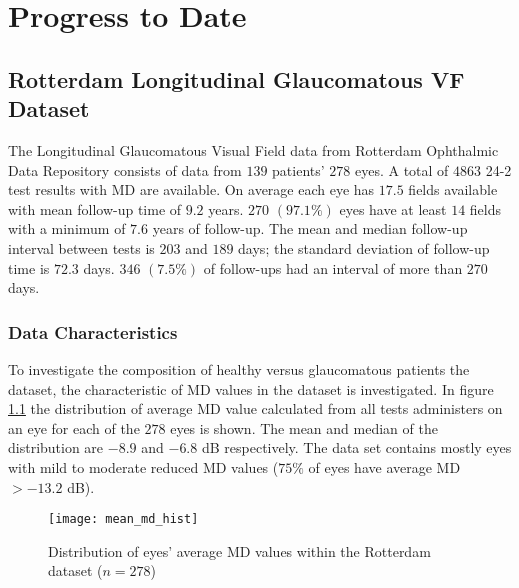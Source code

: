 \chapter{Progress to Date}

\section{Rotterdam Longitudinal Glaucomatous \ac{VF} Dataset}

The Longitudinal Glaucomatous Visual Field data from Rotterdam Ophthalmic Data Repository \cite{Bryan2013} consists of data from $139$ patients' $278$ eyes. A total of $4863$ 24-2 test results with MD are available. On average each eye has $17.5$ fields available with mean follow-up time of $9.2$ years. $270$ $(97.1\%)$ eyes have at least $14$ fields with a minimum of $7.6$ years of follow-up. The mean and median follow-up interval between tests is $203$ and $189$ days; the standard deviation of follow-up time is $72.3$ days. $346$ $(7.5\%)$ of follow-ups had an interval of more than $270$ days. 

\subsection{Data Characteristics}

To investigate the composition of healthy versus glaucomatous patients the dataset, the characteristic of MD values in the dataset is investigated. In figure \ref{fig:mean_md_hist} the distribution of average MD value calculated from all tests administers on an eye for each of the $278$ eyes is shown. The mean and median of the distribution are $-8.9$ and $-6.8$ dB respectively. The data set contains mostly eyes with mild to moderate reduced MD values ($75\%$ of eyes have average MD $>-13.2$ dB).

\begin{figure}[h]
	\centering
	\texttt{[image: mean\_md\_hist]}	\caption{Distribution of eyes' average MD values within the Rotterdam dataset ($n=278$)}
	\label{fig:mean_md_hist}
\end{figure}
%
%
%
%
%
